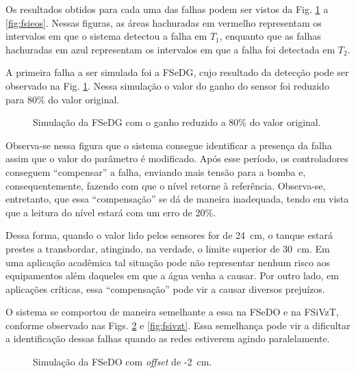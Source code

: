 Os resultados obtidos para cada uma das falhas podem ser vistos da Fig.
\ref{fig:fsedg} a \ref{fig:fsieos}. Nessas figuras, as áreas hachuradas em
vermelho representam os intervalos em que o sistema detectou a falha em $T_1$,
enquanto que as falhas hachuradas em azul representam os intervalos em que a
falha foi detectada em $T_2$.

A primeira falha a ser simulada foi a FSeDG, cujo resultado da detecção pode ser
observado na Fig. \ref{fig:fsedg}. Nessa simulação o valor do ganho do sensor
foi reduzido para 80\% do valor original. 

\begin{figure}[htb]
\footnotesize
\centering

\vspace{1cm}
\caption{Simulação da FSeDG com o ganho reduzido a 80\% do valor original.}
\label{fig:fsedg}
\end{figure}

Observa-se nessa figura que o sistema consegue identificar a presença da falha
assim que o valor do parâmetro é modificado. Após esse período, os controladores
conseguem ``compensar'' a falha, enviando mais tensão para a bomba e,
consequentemente, fazendo com que o nível retorne à referência. Observa-se,
entretanto, que essa ``compensação'' se dá de maneira inadequada, tendo em vista
que a leitura do nível estará com um erro de 20\%. 

Dessa forma, quando o valor lido pelos sensores for de 24\ cm, o tanque estará
prestes a transbordar, atingindo, na verdade, o limite superior de 30\ cm. Em
uma aplicação acadêmica tal situação pode não representar nenhum risco aos
equipamentos além daqueles em que a água venha a causar. Por outro lado, em
aplicações críticas, essa ``compensação'' pode vir a causar diversos prejuízos.

O sistema se comportou de maneira semelhante a essa na FSeDO e na FSiVzT,
conforme observado nas Figs. \ref{fig:fsedo} e \ref{fig:fsivzt}. Essa semelhança
pode vir a dificultar a identificação dessas falhas quando as redes estiverem
agindo paralelamente.

\begin{figure}[htb]
\footnotesize
\centering

\vspace{1cm}
\caption{Simulação da FSeDO com {\it offset} de -2\ cm.}
\label{fig:fsedo}
\end{figure}

